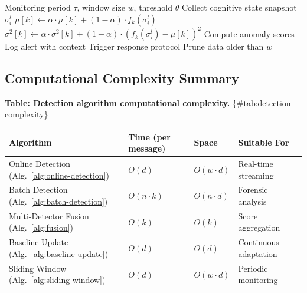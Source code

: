 \documentclass[
]{article}
\newcounter{none} %
\begin{document}
\begin{algorithm}
\caption{Sliding Window Monitoring}
\label{alg:sliding-window}
\begin{algorithmic}[1]
\Require Monitoring period $\tau$, window size $w$, threshold $\theta$
\Loop {}
    \State Collect cognitive state snapshot $\sigma_i^t$
        \State $\mu[k] \gets \alpha \cdot \mu[k] + (1-\alpha) \cdot f_k(\sigma_i^t)$
        \State $\sigma^2[k] \gets \alpha \cdot \sigma^2[k] + (1-\alpha) \cdot (f_k(\sigma_i^t) - \mu[k])^2$
    \EndFor
    \State Compute anomaly scores
        \State Log alert with context
        \State Trigger response protocol
    \EndIf
    \State Prune data older than $w$
\EndLoop
\end{algorithmic}
\end{algorithm}

\subsection{Computational Complexity
Summary}\label{sec:detection-complexity}

\textbf{Table: Detection algorithm computational complexity.}
\{\#tab:detection-complexity\}

{\def\LTcaptype{none} %
\begin{longtable}[]{@{}
  >{\raggedright\arraybackslash}p{}
  >{\raggedright\arraybackslash}p{}
  >{\raggedright\arraybackslash}p{}
  >{\raggedright\arraybackslash}p{}@{}}
\toprule\noalign{}
\begin{minipage}[b]{\linewidth}\raggedright
Algorithm
\end{minipage} & \begin{minipage}[b]{\linewidth}\raggedright
Time (per message)
\end{minipage} & \begin{minipage}[b]{\linewidth}\raggedright
Space
\end{minipage} & \begin{minipage}[b]{\linewidth}\raggedright
Suitable For
\end{minipage} \\
\midrule\noalign{}
\endhead
\bottomrule\noalign{}
\endlastfoot
Online Detection (Alg.~\ref{alg:online-detection}) & \(O(d)\) &
\(O(w \cdot d)\) & Real-time streaming \\
Batch Detection (Alg.~\ref{alg:batch-detection}) & \(O(n \cdot k)\) &
\(O(n \cdot d)\) & Forensic analysis \\
Multi-Detector Fusion (Alg.~\ref{alg:fusion}) & \(O(k)\) & \(O(k)\) &
Score aggregation \\
Baseline Update (Alg.~\ref{alg:baseline-update}) & \(O(d)\) & \(O(d)\) &
Continuous adaptation \\
Sliding Window (Alg.~\ref{alg:sliding-window}) & \(O(d)\) &
\(O(w \cdot d)\) & Periodic monitoring \\
\end{longtable}
}
\end{document}

